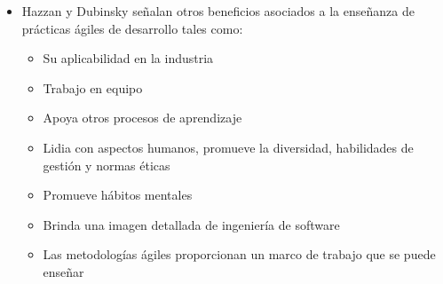 \begin{itemize}
    \item Hazzan y Dubinsky \cite{hazzan-dubinsky} señalan otros beneficios asociados a la enseñanza de prácticas ágiles de desarrollo tales como:
    \begin{itemize}
        \item Su aplicabilidad en la industria
        \item Trabajo en equipo
        \item Apoya otros procesos de aprendizaje
        \item Lidia con aspectos humanos, promueve la diversidad, habilidades de gestión y normas éticas
        \item Promueve hábitos mentales
        \item Brinda una imagen detallada de ingeniería de software
        \item Las metodologías ágiles proporcionan un marco de trabajo que se puede enseñar
    \end{itemize}
\end{itemize}

